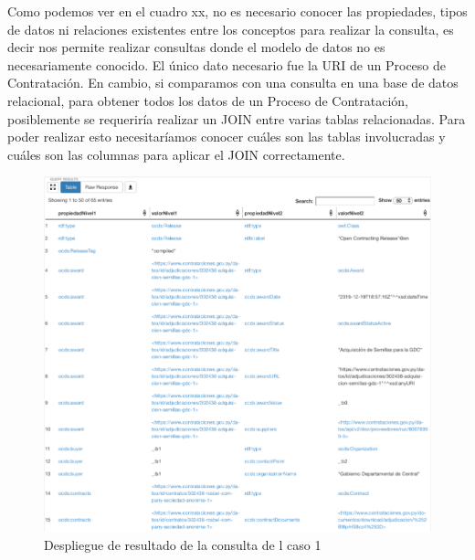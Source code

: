 Como podemos ver en el cuadro xx, no es necesario conocer las propiedades, tipos de datos ni relaciones existentes entre los conceptos para realizar la consulta, es decir nos permite realizar consultas donde el modelo de datos no es necesariamente conocido. El único dato necesario fue la URI de un Proceso de Contratación. En cambio, si comparamos con una consulta en una base de datos relacional, para obtener todos los datos de un Proceso de Contratación, posiblemente se requeriría realizar un JOIN entre varias tablas relacionadas. Para poder realizar esto necesitaríamos conocer cuáles son las tablas involucradas y cuáles son las columnas para aplicar el JOIN correctamente.


\begin{figure}[ht!]
    \centering
    \includegraphics[width=150mm]{figuras/caso1Resultado.png}
    \caption{Despliegue de resultado de la consulta de l caso 1}
    \label{img:caso1Resultado}
 \end{figure}
